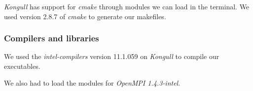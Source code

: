 \emph{Kongull} has support for \emph{cmake} through modules we can load in the terminal. We used version 2.8.7 of \emph{cmake} to generate our makefiles. 

\subsubsection{Compilers and libraries} %
\label{ssub:compilers}
We used the \emph{intel-compilers} version 11.1.059 on \emph{Kongull} to compile our executables. 

We also had to load the modules for \emph{OpenMPI 1.4.3-intel}. 




